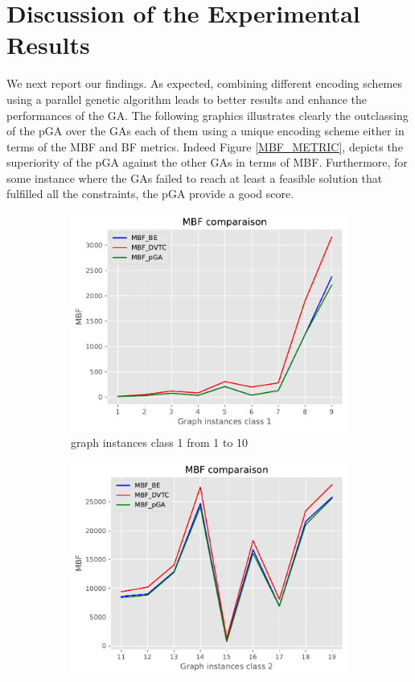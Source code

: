 \documentclass[review]{elsarticle}
\begin{document}
\section {Discussion of the Experimental Results}
We next report our findings. As expected, combining different encoding schemes using a parallel genetic algorithm leads to better results and enhance the performances of the GA. The following graphics illustrates clearly the outclassing of the pGA over the GAs each of them using a unique encoding scheme either in terms of the MBF and BF metrics. Indeed Figure \ref{MBF_METRIC}, depicts the superiority of the pGA against the other GAs in terms of MBF. Furthermore, for some instance where the GAs failed to reach at least a feasible solution that fulfilled all the constraints, the pGA provide a good score.
\begin{center}
	\begin{figure}[H]
		\begin{subfigure}{0.45\textwidth}
			\includegraphics[width=\textwidth]{figurePaper/MBF_C1.pdf} 
			\caption{\label{MBF_METRIC_C1} graph instances class 1 from 1 to 10}
		\end{subfigure}
		\hfill
		\begin{subfigure}{0.45\textwidth}
			\includegraphics[width=\textwidth]{figurePaper/MBF_C2.pdf} 

\end{subfigure}
\end{figure}
\end{center}
\end{document}
